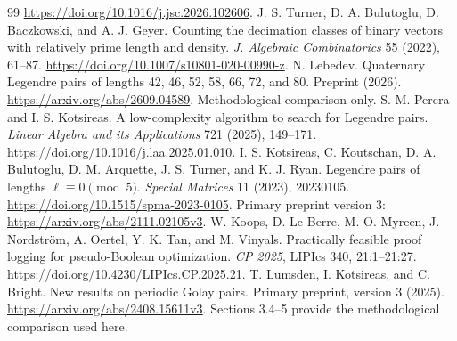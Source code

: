 \documentclass[11pt]{article}
\begin{document}
\begin{thebibliography}{99}
\url{https://doi.org/10.1016/j.jsc.2026.102606}.
 J. S. Turner, D. A. Bulutoglu, D. Baczkowski, and A. J. Geyer.
Counting the decimation classes of binary vectors with relatively prime
length and density. \emph{J. Algebraic Combinatorics} 55 (2022), 61--87.
\url{https://doi.org/10.1007/s10801-020-00990-z}.
 N. Lebedev. Quaternary Legendre pairs of lengths
42, 46, 52, 58, 66, 72, and 80. Preprint (2026).
\url{https://arxiv.org/abs/2609.04589}. Methodological comparison only.
 S. M. Perera and I. S. Kotsireas.
A low-complexity algorithm to search for Legendre pairs.
\emph{Linear Algebra and its Applications} 721 (2025), 149--171.
\url{https://doi.org/10.1016/j.laa.2025.01.010}.
 I. S. Kotsireas, C. Koutschan, D. A. Bulutoglu,
D. M. Arquette, J. S. Turner, and K. J. Ryan.
Legendre pairs of lengths $\ell\equiv0\pmod5$.
\emph{Special Matrices} 11 (2023), 20230105.
\url{https://doi.org/10.1515/spma-2023-0105}.
Primary preprint version 3: \url{https://arxiv.org/abs/2111.02105v3}.
 W. Koops, D. Le Berre, M. O. Myreen, J. Nordstr\"om,
A. Oertel, Y. K. Tan, and M. Vinyals.
Practically feasible proof logging for pseudo-Boolean optimization.
\emph{CP 2025}, LIPIcs 340, 21:1--21:27.
\url{https://doi.org/10.4230/LIPIcs.CP.2025.21}.
 T. Lumsden, I. Kotsireas, and C. Bright.
New results on periodic Golay pairs. Primary preprint, version 3 (2025).
\url{https://arxiv.org/abs/2408.15611v3}.
Sections 3.4--5 provide the methodological comparison used here.
\end{thebibliography}
\end{document}

